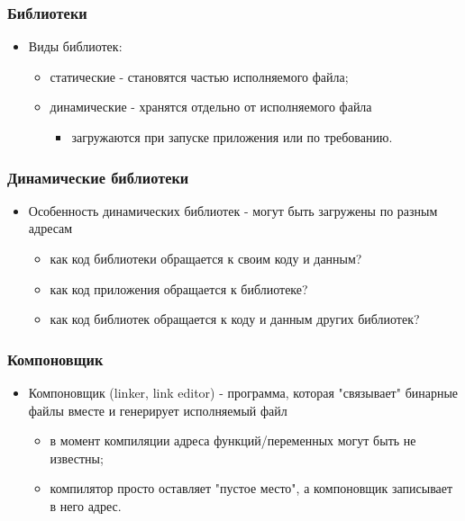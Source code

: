 \begin{frame}
\frametitle{Библиотеки}
\begin{itemize}
    \item<1->Виды библиотек:
    \begin{itemize}
        \item<2->статические - становятся частью исполняемого файла;
        \item<3->динамические - хранятся отдельно от исполняемого файла
        \begin{itemize}
            \item<4->загружаются при запуске приложения или по требованию.
        \end{itemize}
    \end{itemize}
\end{itemize}
\end{frame}

\begin{frame}
\frametitle{Динамические библиотеки}
\begin{itemize}
    \item<1->Особенность динамических библиотек - могут быть загружены
         по разным адресам
    \begin{itemize}
        \item<2->как код библиотеки обращается к своим коду и данным?
        \item<3->как код приложения обращается к библиотеке?
        \item<4->как код библиотек обращается к коду и данным других библиотек?
    \end{itemize}
\end{itemize}
\end{frame}

\begin{frame}
\frametitle{Компоновщик}
\begin{itemize}
    \item<1->Компоновщик (linker, link editor) - программа, которая "связывает"
         бинарные файлы вместе и генерирует исполняемый файл
    \begin{itemize}
        \item<2->в момент компиляции адреса функций/переменных могут быть не
             известны;
        \item<3->компилятор просто оставляет "пустое место", а компоновщик
             записывает в него адрес.
    \end{itemize}
\end{itemize}
\end{frame}

